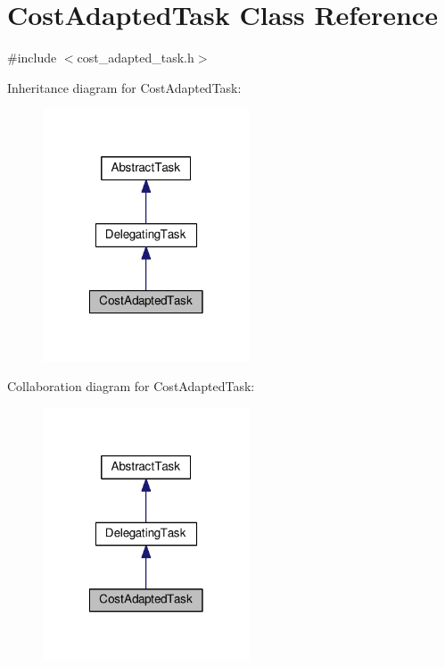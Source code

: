 \hypertarget{classCostAdaptedTask}{\section{Cost\-Adapted\-Task Class Reference}
\label{classCostAdaptedTask}
}


{\ttfamily \#include $<$cost\-\_\-adapted\-\_\-task.\-h$>$}



Inheritance diagram for Cost\-Adapted\-Task\-:
\nopagebreak
\begin{figure}[H]
\begin{center}
\leavevmode
\includegraphics[width=174pt]{classCostAdaptedTask__inherit__graph}
\end{center}
\end{figure}


Collaboration diagram for Cost\-Adapted\-Task\-:
\nopagebreak
\begin{figure}[H]
\begin{center}
\leavevmode
\includegraphics[width=174pt]{classCostAdaptedTask__coll__graph}
\end{center}
\end{figure}

